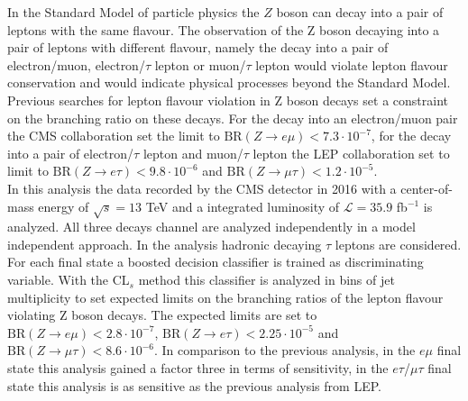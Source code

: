 \thispagestyle{empty}

In the Standard Model of particle physics the $Z$ boson can decay into a pair of leptons with the same flavour. The observation of the Z boson decaying into a pair of leptons with different flavour, namely the decay into a pair of electron/muon, electron/$\tau$ lepton or muon/$\tau$ lepton would violate lepton flavour conservation and would indicate physical processes beyond the Standard Model. \\

Previous searches for lepton flavour violation in Z boson decays set a constraint on the branching ratio on these decays. For the decay into an electron/muon pair the CMS collaboration set the limit to $\text{BR}(Z\to e\mu) < 7.3\cdot 10^{-7}$, for the decay into a pair of electron/$\tau$ lepton and muon/$\tau$ lepton the LEP collaboration set to limit to $\text{BR}(Z\to e\tau) < 9.8\cdot 10^{-6}$ and $\text{BR}(Z\to \mu\tau) < 1.2\cdot 10^{-5}$. \\

In this analysis the data recorded by the CMS detector in 2016 with a center-of-mass energy of $\sqrt{s} = 13$ TeV and a integrated luminosity of $\mathcal{L} = 35.9$ fb$^{-1}$ is analyzed. All three decays channel are analyzed independently in a model independent approach. In the analysis hadronic decaying $\tau$ leptons are considered. For each final state a boosted decision classifier is trained as discriminating variable. With the CL$_s$ method this classifier is analyzed in bins of jet multiplicity to set expected limits on the branching ratios of the lepton flavour violating Z boson decays. The expected limits are set to $\text{BR}(Z\to e\mu) < 2.8\cdot 10^{-7}$,  $\text{BR}(Z\to e\tau) < 2.25\cdot 10^{-5}$ and  $\text{BR}(Z\to \mu\tau) < 8.6\cdot 10^{-6}$. In comparison to the previous analysis, in the $e\mu$ final state this analysis gained a factor three in terms of sensitivity, in the $e\tau$/$\mu\tau$ final state this analysis is as sensitive as the previous analysis from LEP.
